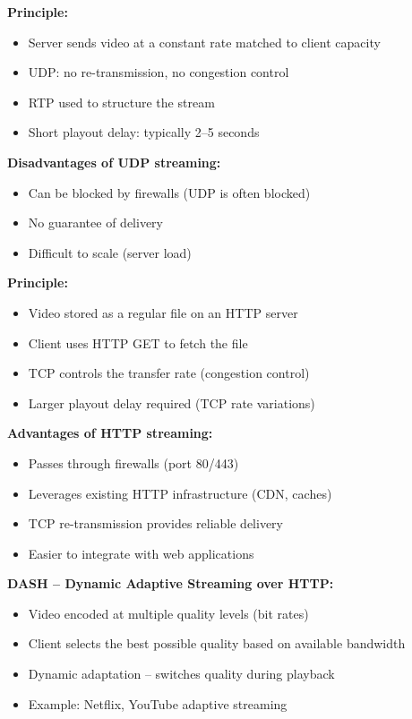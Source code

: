 \begin{tcolorbox}[keybox, title=UDP Streaming]
\textbf{Principle:}
\begin{itemize}[nosep]
  \item Server sends video at a constant rate matched to client capacity
  \item UDP: no re-transmission, no congestion control
  \item RTP used to structure the stream
  \item Short playout delay: typically 2--5 seconds
\end{itemize}

\medskip
\textbf{Disadvantages of UDP streaming:}
\begin{itemize}[nosep]
  \item Can be blocked by firewalls (UDP is often blocked)
  \item No guarantee of delivery
  \item Difficult to scale (server load)
\end{itemize}
\end{tcolorbox}

\begin{tcolorbox}[keybox, title=HTTP Streaming -- the dominant method]
\textbf{Principle:}
\begin{itemize}[nosep]
  \item Video stored as a regular file on an HTTP server
  \item Client uses HTTP GET to fetch the file
  \item TCP controls the transfer rate (congestion control)
  \item Larger playout delay required (TCP rate variations)
\end{itemize}

\medskip
\textbf{Advantages of HTTP streaming:}
\begin{itemize}[nosep]
  \item Passes through firewalls (port 80/443)
  \item Leverages existing HTTP infrastructure (CDN, caches)
  \item TCP re-transmission provides reliable delivery
  \item Easier to integrate with web applications
\end{itemize}

\medskip
\textbf{DASH -- Dynamic Adaptive Streaming over HTTP:}
\begin{itemize}[nosep]
  \item Video encoded at multiple quality levels (bit rates)
  \item Client selects the best possible quality based on available bandwidth
  \item Dynamic adaptation -- switches quality during playback
  \item Example: Netflix, YouTube adaptive streaming
\end{itemize}
\end{tcolorbox}

